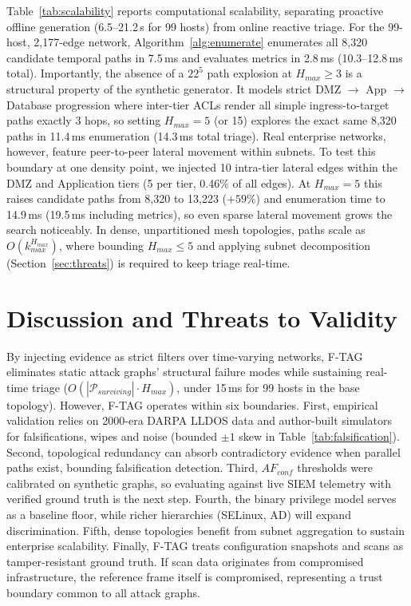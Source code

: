 \documentclass[12pt]{article}
\begin{document}
Table~\ref{tab:scalability} reports computational scalability, separating proactive offline generation (6.5--21.2\,s for 99 hosts) from online reactive triage. For the 99-host, 2,177-edge network, Algorithm~\ref{alg:enumerate} enumerates all 8,320 candidate temporal paths in 7.5\,ms and evaluates metrics in 2.8\,ms (10.3--12.8\,ms total). Importantly, the absence of a $22^5$ path explosion at $H_{max} \ge 3$ is a structural property of the synthetic generator. It models strict DMZ $\to$ App $\to$ Database progression where inter-tier ACLs render all simple ingress-to-target paths exactly 3 hops, so setting $H_{max}=5$ (or 15) explores the exact same 8,320 paths in 11.4\,ms enumeration (14.3\,ms total triage). Real enterprise networks, however, feature peer-to-peer lateral movement within subnets. To test this boundary at one density point, we injected 10 intra-tier lateral edges within the DMZ and Application tiers (5 per tier, 0.46\% of all edges). At $H_{max}=5$ this raises candidate paths from 8,320 to 13,223 ($+59\%$) and enumeration time to 14.9\,ms (19.5\,ms including metrics), so even sparse lateral movement grows the search noticeably. In dense, unpartitioned mesh topologies, paths scale as $O(k_{max}^{H_{max}})$, where bounding $H_{max}\le 5$ and applying subnet decomposition (Section~\ref{sec:threats}) is required to keep triage real-time.

\section{Discussion and Threats to Validity}\label{sec:discussion}\label{sec:threats}

By injecting evidence as strict filters over time-varying networks, F-TAG eliminates static attack graphs' structural failure modes while sustaining real-time triage ($O(|\mathcal{P}_{surviving}| \cdot H_{max})$, under 15\,ms for 99 hosts in the base topology). However, F-TAG operates within six boundaries. First, empirical validation relies on 2000-era DARPA LLDOS data and author-built simulators for falsifications, wipes and noise (bounded $\pm 1$ skew in Table~\ref{tab:falsification}). Second, topological redundancy can absorb contradictory evidence when parallel paths exist, bounding falsification detection. Third, $AF_{conf}$ thresholds were calibrated on synthetic graphs, so evaluating against live SIEM telemetry with verified ground truth is the next step. Fourth, the binary privilege model serves as a baseline floor, while richer hierarchies (SELinux, AD) will expand discrimination. Fifth, dense topologies benefit from subnet aggregation to sustain enterprise scalability. Finally, F-TAG treats configuration snapshots and scans as tamper-resistant ground truth. If scan data originates from compromised infrastructure, the reference frame itself is compromised, representing a trust boundary common to all attack graphs.
\end{document}
